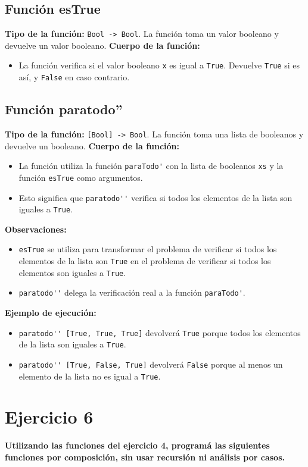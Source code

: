 \documentclass{article}
\begin{document}
\subsection*{Función esTrue}
    \textbf{Tipo de la función:} \verb|Bool -> Bool|. La función toma un valor booleano y devuelve un valor booleano.
    \textbf{Cuerpo de la función:}
    \begin{itemize}
    \item La función verifica si el valor booleano \verb|x| es igual a \verb|True|. Devuelve \verb|True| si es así, y \verb|False| en caso contrario.
    \end{itemize}
\subsection*{Función paratodo''}
    \textbf{Tipo de la función:} \verb|[Bool] -> Bool|. La función toma una lista de booleanos y devuelve un booleano.
    \textbf{Cuerpo de la función:}
    \begin{itemize}
    \item La función utiliza la función \verb|paraTodo'| con la lista de booleanos \verb|xs| y la función \verb|esTrue| como argumentos.
    \item Esto significa que \verb|paratodo''| verifica si todos los elementos de la lista son iguales a \verb|True|.
    \end{itemize}
    \textbf{Observaciones:}
    \begin{itemize}
    \item \verb|esTrue| se utiliza para transformar el problema de verificar si todos los elementos de la lista son \verb|True| en el problema de verificar si todos los elementos son iguales a \verb|True|.
    \item \verb|paratodo''| delega la verificación real a la función \verb|paraTodo'|.
    \end{itemize}
    \textbf{Ejemplo de ejecución:}
    \begin{itemize}
    \item \verb|paratodo'' [True, True, True]| devolverá \verb|True| porque todos los elementos de la lista son iguales a \verb|True|.
    \item \verb|paratodo'' [True, False, True]| devolverá \verb|False| porque al menos un elemento de la lista no es igual a \verb|True|.
\end{itemize}

\section*{Ejercicio 6}
\textbf{Utilizando las funciones del ejercicio 4, programá las siguientes funciones por composición, sin usar recursión ni análisis por casos.}
\end{document}
